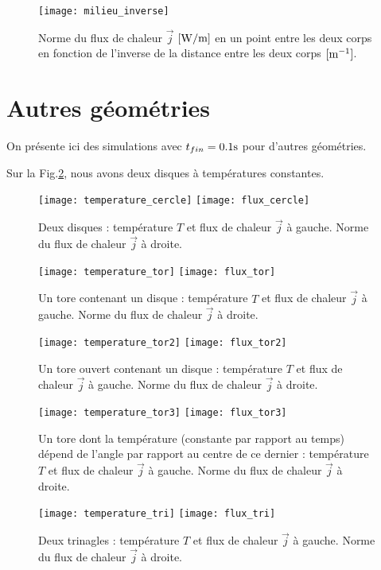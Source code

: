 \documentclass[a4paper,12pt,oneside]{article}
\begin{document}
 \begin{figure}[H]
    \centering
    \texttt{[image: milieu\_inverse]}
    \caption{Norme du flux de chaleur $\Vec{j}$ $\rm [W/m]$ en un point entre les deux corps en fonction de l'inverse de la distance entre les deux corps $\rm [m^{-1}]$.}
    \label{milieu_inverse}
\end{figure}

\section{Autres géométries}
 On présente ici des simulations avec $t_{fin}=0.1 \rm s $ pour d'autres géométries.
 
 Sur la Fig.\ref{cercle}, nous avons deux disques à températures constantes.

\begin{figure}[H]
    \centering
    \texttt{[image: temperature\_cercle]}
    \texttt{[image: flux\_cercle]}
    \caption{Deux disques : température $T$ et flux de chaleur $\Vec{j}$ à gauche. Norme du flux de chaleur $\Vec{j}$ à droite.}
    \label{cercle}
\end{figure}

\begin{figure}[H]
    \centering
    \texttt{[image: temperature\_tor]}
    \texttt{[image: flux\_tor]}
    \caption{Un tore contenant un disque : température $T$ et flux de chaleur $\Vec{j}$ à gauche. Norme du flux de chaleur $\Vec{j}$ à droite.}
    \label{tor}
\end{figure}

\begin{figure}[H]
    \centering
    \texttt{[image: temperature\_tor2]}
    \texttt{[image: flux\_tor2]}
    \caption{Un tore ouvert contenant un disque : température $T$ et flux de chaleur $\Vec{j}$ à gauche. Norme du flux de chaleur $\Vec{j}$ à droite.}
    \label{tor2}
\end{figure}

\begin{figure}[H]
    \centering
    \texttt{[image: temperature\_tor3]}
    \texttt{[image: flux\_tor3]}
    \caption{Un tore dont la température (constante par rapport au temps) dépend de l'angle par rapport au centre de ce dernier : température $T$ et flux de chaleur $\Vec{j}$ à gauche. Norme du flux de chaleur $\Vec{j}$ à droite.}
    \label{tor3}
\end{figure}

\begin{figure}[H]
    \centering
    \texttt{[image: temperature\_tri]}
    \texttt{[image: flux\_tri]}
    \caption{Deux trinagles : température $T$ et flux de chaleur $\Vec{j}$ à gauche. Norme du flux de chaleur $\Vec{j}$ à droite.}
    \label{tri}
\end{figure}
\end{document}
